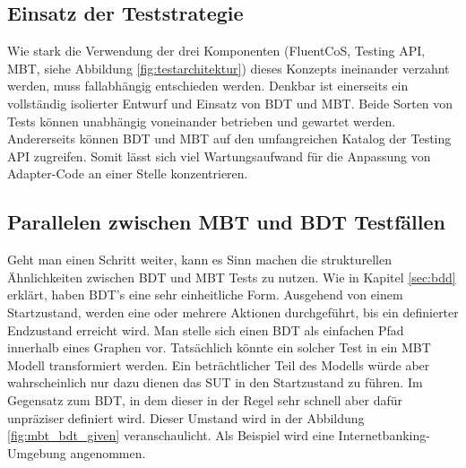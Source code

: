 \subsection{Einsatz der Teststrategie}
Wie stark die Verwendung der drei Komponenten (FluentCoS, Testing API, MBT, siehe Abbildung \ref{fig:testarchitektur}) dieses Konzepts ineinander verzahnt werden, muss fallabhängig entschieden werden. Denkbar ist einerseits ein vollständig isolierter Entwurf und Einsatz von \Gls{BDT} und \Gls{MBT}. Beide Sorten von Tests können unabhängig voneinander betrieben und gewartet werden. Andererseits können \Gls{BDT} und \Gls{MBT} auf den umfangreichen Katalog der Testing API zugreifen. Somit lässt sich viel Wartungsaufwand für die Anpassung von Adapter-Code an einer Stelle konzentrieren.

\subsection{Parallelen zwischen MBT und BDT Testfällen}
\label{sec:mbt_bdt_parallelen}

Geht man einen Schritt weiter, kann es Sinn machen die strukturellen Ähnlichkeiten zwischen \Gls{BDT} und \Gls{MBT} Tests zu nutzen. Wie in Kapitel \ref{sec:bdd} erklärt, haben \Gls{BDT}'s eine sehr einheitliche Form. Ausgehend von einem Startzustand, werden eine oder mehrere Aktionen durchgeführt, bis ein definierter Endzustand erreicht wird. Man stelle sich einen \Gls{BDT} als einfachen Pfad innerhalb eines Graphen vor. Tatsächlich könnte ein solcher Test in ein \Gls{MBT} Modell transformiert werden. Ein beträchtlicher Teil des Modells würde aber wahrscheinlich nur dazu dienen das \Gls{SUT} in den Startzustand zu führen. Im Gegensatz zum \Gls{BDT}, in dem dieser in der Regel sehr schnell aber dafür unpräziser definiert wird. Dieser Umstand wird in der Abbildung \ref{fig:mbt_bdt_given} veranschaulicht. Als Beispiel wird eine Internetbanking-Umgebung angenommen.

